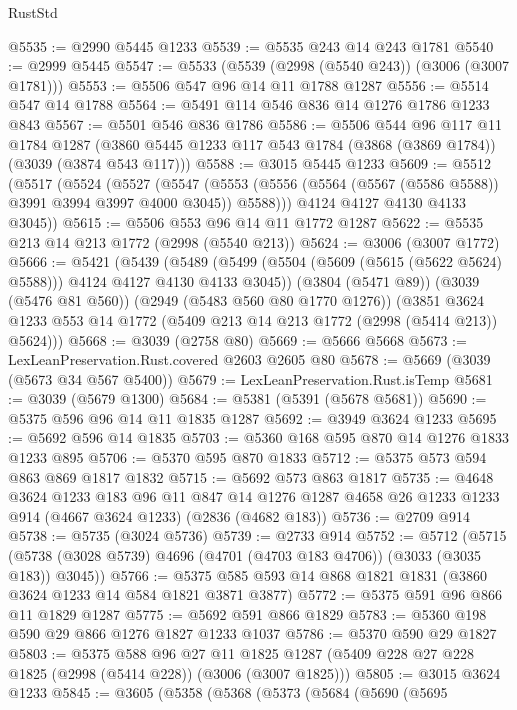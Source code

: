\begin{lexlean}{RustStd}
\begin{coremodule}
@5535 := @2990 @5445 @1233
@5539 := @5535 @243 @14 @243 @1781
@5540 := @2999 @5445
@5547 := @5533 (@5539 (@2998 (@5540 @243)) (@3006 (@3007 @1781)))
@5553 := @5506 @547 @96 @14 @11 @1788 @1287
@5556 := @5514 @547 @14 @1788
@5564 := @5491 @114 @546 @836 @14 @1276 @1786 @1233 @843
@5567 := @5501 @546 @836 @1786
@5586 := @5506
    @544
    @96
    @117
    @11
    @1784
    @1287
    (@3860 @5445 @1233 @117 @543 @1784 (@3868 (@3869 @1784)) (@3039 (@3874 @543 @117)))
@5588 := @3015 @5445 @1233
@5609 := @5512
    (@5517
      (@5524
        (@5527
          (@5547 (@5553 (@5556 (@5564 (@5567 (@5586 @5588)) @3991 @3994 @3997 @4000 @3045)) @5588)))
        @4124
        @4127
        @4130
        @4133
        @3045))
@5615 := @5506 @553 @96 @14 @11 @1772 @1287
@5622 := @5535 @213 @14 @213 @1772 (@2998 (@5540 @213))
@5624 := @3006 (@3007 @1772)
@5666 := @5421
    (@5439
      (@5489 (@5499 (@5504 (@5609 (@5615 (@5622 @5624) @5588))) @4124 @4127 @4130 @4133 @3045))
      (@3804 (@5471 @89))
      (@3039 (@5476 @81 @560))
      (@2949 (@5483 @560 @80 @1770 @1276))
      (@3851 @3624 @1233 @553 @14 @1772 (@5409 @213 @14 @213 @1772 (@2998 (@5414 @213)) @5624)))
@5668 := @3039 (@2758 @80)
@5669 := @5666 @5668
@5673 := LexLeanPreservation.Rust.covered @2603 @2605 @80
@5678 := @5669 (@3039 (@5673 @34 @567 @5400))
@5679 := LexLeanPreservation.Rust.isTemp
@5681 := @3039 (@5679 @1300)
@5684 := @5381 (@5391 (@5678 @5681))
@5690 := @5375 @596 @96 @14 @11 @1835 @1287
@5692 := @3949 @3624 @1233
@5695 := @5692 @596 @14 @1835
@5703 := @5360 @168 @595 @870 @14 @1276 @1833 @1233 @895
@5706 := @5370 @595 @870 @1833
@5712 := @5375 @573 @594 @863 @869 @1817 @1832
@5715 := @5692 @573 @863 @1817
@5735 := @4648
    @3624
    @1233
    @183
    @96
    @11
    @847
    @14
    @1276
    @1287
    @4658
    @26
    @1233
    @1233
    @914
    (@4667 @3624 @1233)
    (@2836 (@4682 @183))
@5736 := @2709 @914
@5738 := @5735 (@3024 @5736)
@5739 := @2733 @914
@5752 := @5712
    (@5715 (@5738 (@3028 @5739) @4696 (@4701 (@4703 @183 @4706)) (@3033 (@3035 @183)) @3045))
@5766 := @5375 @585 @593 @14 @868 @1821 @1831 (@3860 @3624 @1233 @14 @584 @1821 @3871 @3877)
@5772 := @5375 @591 @96 @866 @11 @1829 @1287
@5775 := @5692 @591 @866 @1829
@5783 := @5360 @198 @590 @29 @866 @1276 @1827 @1233 @1037
@5786 := @5370 @590 @29 @1827
@5803 := @5375
    @588
    @96
    @27
    @11
    @1825
    @1287
    (@5409 @228 @27 @228 @1825 (@2998 (@5414 @228)) (@3006 (@3007 @1825)))
@5805 := @3015 @3624 @1233
@5845 := @3605
    (@5358
      (@5368
        (@5373
          (@5684
            (@5690
              (@5695

\end{coremodule}
\end{lexlean}

